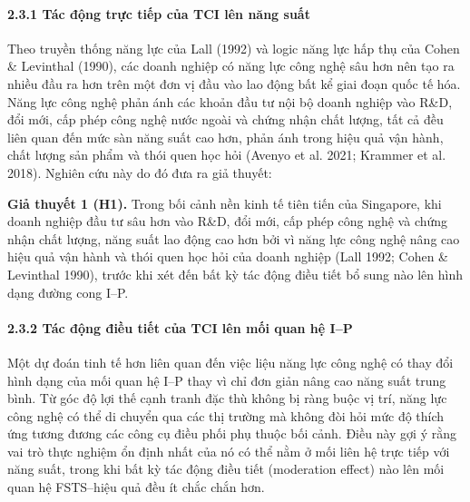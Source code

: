 \documentclass[12pt,a4paper]{article}
\begin{document}
\hypertarget{231-tuxe1c-ux111ux1ed9ng-trux1ef1c-tiux1ebfp-cux1ee7a-tci-luxean-nux103ng-suux1ea5t}{%
\paragraph{2.3.1 Tác động trực tiếp của TCI lên năng
suất}\label{231-tuxe1c-ux111ux1ed9ng-trux1ef1c-tiux1ebfp-cux1ee7a-tci-luxean-nux103ng-suux1ea5t}}

Theo truyền thống năng lực của Lall (1992) và logic năng lực hấp thụ của
Cohen \& Levinthal (1990), các doanh nghiệp có năng lực công nghệ sâu
hơn nên tạo ra nhiều đầu ra hơn trên một đơn vị đầu vào lao động bất kể
giai đoạn quốc tế hóa. Năng lực công nghệ phản ánh các khoản đầu tư nội
bộ doanh nghiệp vào R\&D, đổi mới, cấp phép công nghệ nước ngoài và
chứng nhận chất lượng, tất cả đều liên quan đến mức sàn năng suất cao
hơn, phản ánh trong hiệu quả vận hành, chất lượng sản phẩm và thói quen
học hỏi (Avenyo et al. 2021; Krammer et al. 2018). Nghiên cứu này do đó
đưa ra giả thuyết:

\textbf{Giả thuyết 1 (H1).} Trong bối cảnh nền kinh tế tiên tiến của
Singapore, khi doanh nghiệp đầu tư sâu hơn vào R\&D, đổi mới, cấp phép
công nghệ và chứng nhận chất lượng, năng suất lao động cao hơn bởi vì
năng lực công nghệ nâng cao hiệu quả vận hành và thói quen học hỏi của
doanh nghiệp (Lall 1992; Cohen \& Levinthal 1990), trước khi xét đến bất
kỳ tác động điều tiết bổ sung nào lên hình dạng đường cong I--P.

\hypertarget{232-tuxe1c-ux111ux1ed9ng-ux111iux1ec1u-tiux1ebft-cux1ee7a-tci-luxean-mux1ed1i-quan-hux1ec7-ip}{%
\paragraph{2.3.2 Tác động điều tiết của TCI lên mối quan hệ
I--P}\label{232-tuxe1c-ux111ux1ed9ng-ux111iux1ec1u-tiux1ebft-cux1ee7a-tci-luxean-mux1ed1i-quan-hux1ec7-ip}}

Một dự đoán tinh tế hơn liên quan đến việc liệu năng lực công nghệ có
thay đổi hình dạng của mối quan hệ I--P thay vì chỉ đơn giản nâng cao
năng suất trung bình. Từ góc độ lợi thế cạnh tranh đặc thù không bị ràng
buộc vị trí, năng lực công nghệ có thể di chuyển qua các thị trường mà
không đòi hỏi mức độ thích ứng tương đương các công cụ điều phối phụ
thuộc bối cảnh. Điều này gợi ý rằng vai trò thực nghiệm ổn định nhất của
nó có thể nằm ở mối liên hệ trực tiếp với năng suất, trong khi bất kỳ
tác động điều tiết (moderation effect) nào lên mối quan hệ FSTS--hiệu
quả đều ít chắc chắn hơn.
\end{document}
